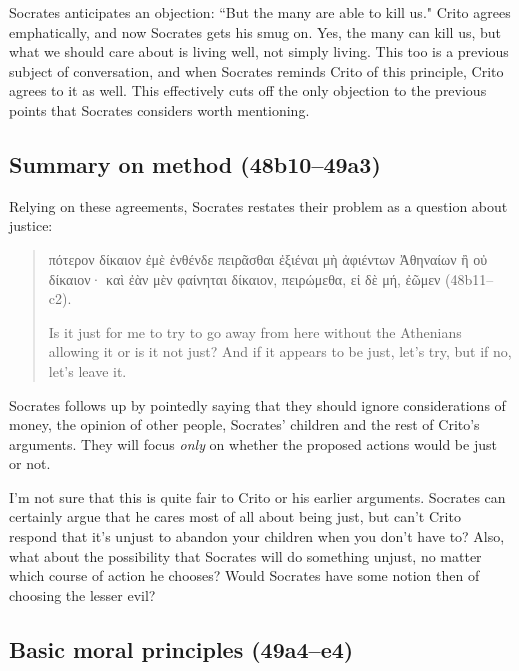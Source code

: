 \documentclass[11pt]{article}
\begin{document}
Socrates anticipates an objection: ``But the many are able to kill us." Crito
agrees emphatically, and now Socrates gets his smug on. Yes, the many can kill
us, but what we should care about is living well, not simply living.  This too
is a previous subject of conversation, and when Socrates reminds Crito of this
principle, Crito agrees to it as well.  This effectively cuts off the only
objection to the previous points that Socrates considers worth mentioning.


\subsection{Summary on method (48b10--49a3)}

Relying on these agreements, Socrates restates their problem as a question
about justice:

\begin{quote}
    {\g πότερον δίκαιον ἐμὲ ἐνθένδε πειρᾶσθαι ἐξιέναι μὴ ἀφιέντων Ἀθηναίων ἢ οὐ
    δίκαιον· καὶ ἐὰν μὲν φαίνηται δίκαιον, πειρώμεθα, εἰ δὲ μή, ἐῶμεν}
    (48b11--c2).

    Is it just for me to try to go away from here without the Athenians
    allowing it or is it not just? And if it appears to be just, let's try, but
    if no, let's leave it.
\end{quote}

Socrates follows up by pointedly saying that they should ignore considerations
of money, the opinion of other people, Socrates' children and the rest of
Crito's arguments.  They will focus \emph{only} on whether the proposed actions
would be just or not.

I'm not sure that this is quite fair to Crito or his earlier arguments.
Socrates can certainly argue that he cares most of all about being just, but
can't Crito respond that it's unjust to abandon your children when you don't
have to?  Also, what about the possibility that Socrates will do something
unjust, no matter which course of action he chooses?  Would Socrates have some
notion then of choosing the lesser evil?


\subsection{Basic moral principles (49a4--e4)}
\end{document}
